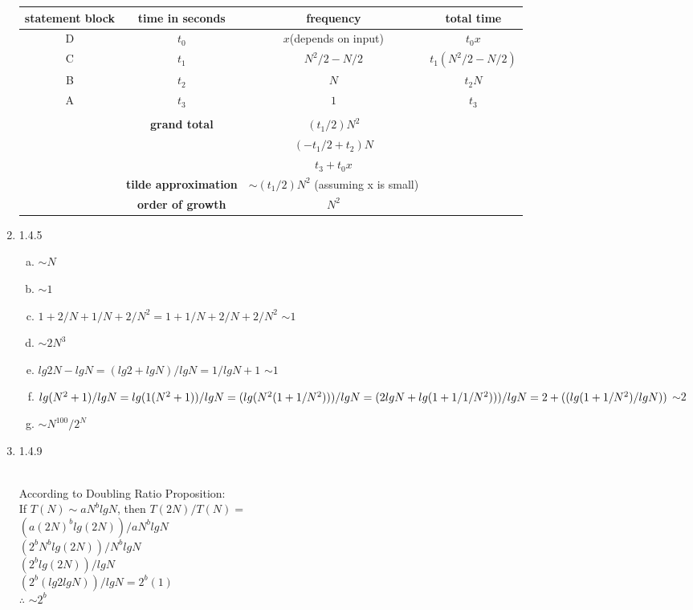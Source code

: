 \documentclass[11pt]{article}
\begin{document}
\begin{enumerate}
\begin{solution}
\begin{tabular}{cccc}
\bf statement block & \bf time in seconds & \bf frequency & \bf total time\\
\hline
D & $t_0$ & $x$(depends on input) & $t_0 x$\\
C & $t_1$ & $N^2 / 2 - N/2$& $t_1 (N^2 / 2 - N/2)$\\
B & $t_2$ & $N$ & $t_2 N$\\
A & $t_3$ & $1$ & $t_3$\\
\\
& \bf grand total & $(t_1 /2)N^2$\\
&& $(-t_1 /2 + t_2)N$\\
&& $t_3 + t_0 x$\\
& \bf tilde approximation & $ \sim (t_1 /2)N^2$ (assuming x is small)\\
& \bf order of growth &$N^2$\\
\end{tabular}



\end{solution}

\item 1.4.5
\begin{solution}

\begin{enumerate}[(a)] 
\item $\sim N$
\item $\sim 1$
\item $1+2/N + 1/N + 2/N^2 = 1+ 1/N + 2/N + 2/N^2$ \space \space $\sim 1$
\item $\sim 2N^3$
\item $ lg 2N -lg N = (lg2 + lgN) / lgN = 1/lgN + 1$ \space \space $\sim 1$
\item $lg(N^2 + 1) / lgN  = lg(1 (N^2 +1)) / lgN \\
= (lg (N^2 (1+ 1/N^2))) / lgN \\
= (2 lgN +lg(1+1/1/N^2))) / lgN \\
= 2 + ((lg(1+1/N^2) /lgN))$ \space \space \space $\sim 2$
\item $\sim N^{100} / 2^N $
\end{enumerate}

\end{solution}

\item 1.4.9
\begin{solution}\\
According to Doubling Ratio Proposition:\\
If $T(N) \sim aN^b lgN$, then $T(2N) / T(N) =$\\
$(a(2N)^b lg(2N)) / aN^b lgN$\\
$(2^b N^b lg(2N)) / N^b lgN$\\
$(2^b lg(2N)) / lgN$\\
$(2^b (lg2 lgN)) / lgN = 2^b(1)$\\
$\therefore$  \space $\sim 2^b$\\


\end{solution}
\end{enumerate}
\end{document}
